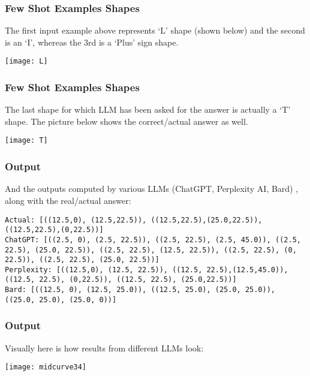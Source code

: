 \begin{frame}[fragile]\frametitle{Few Shot Examples Shapes}
The first input example above represents ‘L’ shape (shown below) and the second is an ‘I’, whereas the 3rd is a ‘Plus’ sign shape.

\begin{center}
\texttt{[image: L]}
\end{center}	
\end{frame}

\begin{frame}[fragile]\frametitle{Few Shot Examples Shapes}
The last shape for which LLM has been asked for the answer is actually a ‘T’ shape. The picture below shows the correct/actual answer as well.

\begin{center}
\texttt{[image: T]}
\end{center}	
\end{frame}

\begin{frame}[fragile]\frametitle{Output}
And the outputs computed by various LLMs (ChatGPT, Perplexity AI, Bard) , along with the real/actual answer:

\begin{lstlisting}
Actual: [((12.5,0), (12.5,22.5)), ((12.5,22.5),(25.0,22.5)), ((12.5,22.5),(0,22.5))]
ChatGPT: [((2.5, 0), (2.5, 22.5)), ((2.5, 22.5), (2.5, 45.0)), ((2.5, 22.5), (25.0, 22.5)), ((2.5, 22.5), (12.5, 22.5)), ((2.5, 22.5), (0, 22.5)), ((2.5, 22.5), (25.0, 22.5))]
Perplexity: [((12.5,0), (12.5, 22.5)), ((12.5, 22.5),(12.5,45.0)), ((12.5, 22.5), (0,22.5)), ((12.5, 22.5), (25.0,22.5))]
Bard: [((12.5, 0), (12.5, 25.0)), ((12.5, 25.0), (25.0, 25.0)), ((25.0, 25.0), (25.0, 0))]
\end{lstlisting}	
\end{frame}

\begin{frame}[fragile]\frametitle{Output}

Visually here is how results from different LLMs look:

\begin{center}
\texttt{[image: midcurve34]}
\end{center}	
\end{frame}

